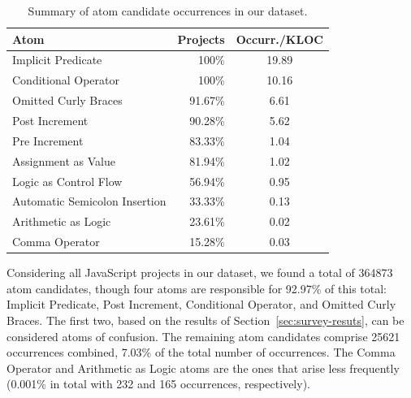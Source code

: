 \begin{table}[ht]
\centering
\caption{Summary of atom candidate occurrences in our dataset.}
\setlength\tabcolsep{2pt} %
\begin{tabular}{lrc}%
  \toprule
Atom & Projects & Occurr./KLOC \\%
  \midrule
Implicit Predicate & 100\% & 19.89 \\%
  Conditional Operator & 100\% & 10.16 \\%
  Omitted Curly Braces & 91.67\% & 6.61 \\%
  Post Increment & 90.28\% & 5.62 \\%
  Pre Increment & 83.33\% & 1.04 \\%
  Assignment as Value & 81.94\% & 1.02 \\%
  Logic as Control Flow & 56.94\% & 0.95 \\%
  Automatic Semicolon Insertion & 33.33\% & 0.13 \\%
  Arithmetic as Logic & 23.61\% & 0.02 \\%
  Comma Operator & 15.28\% & 0.03 \\%
   \bottomrule
\end{tabular}
\label{tab:occurrences-summary}
\end{table}


Considering all JavaScript projects in our dataset, we found a total of \num{364873} atom candidates, though four atoms are responsible
for 92.97\% of this total: Implicit Predicate, Post Increment, Conditional Operator, and Omitted Curly Braces. The first two, based on the results of Section~\ref{sec:survey-resuts}, can be considered atoms of confusion. The remaining atom
candidates comprise \num{25621} occurrences combined, 7.03\% of the total number of occurrences.
The Comma Operator and Arithmetic as Logic atoms are the ones that arise less
frequently (0.001\% in total with 232 and 165 occurrences, respectively). 

